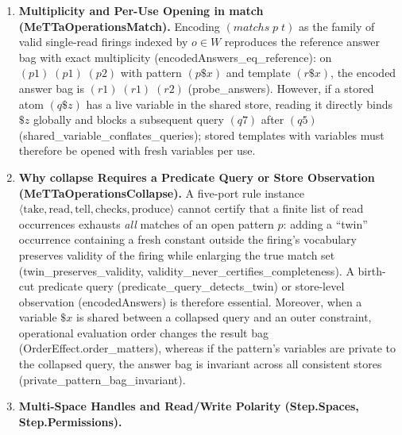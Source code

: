\documentclass[11pt,a4paper]{article}
\theoremstyle{definition}
\DeclareRobustCommand{\lean}[1]{%
  \ifmmode\text{\normalfont\ttfamily\footnotesize\detokenize{#1}}%
  \else{\normalfont\footnotesize\leanurl{#1}}\fi}
\DeclareRobustCommand{\metta}[1]{\text{\normalfont\ttfamily\footnotesize #1}}
\def\lean#1{#1}%
\def\metta#1{#1}%
\begin{document}
\begin{enumerate}[leftmargin=2em, nosep]
  \item \textbf{Multiplicity and Per-Use Opening in \metta{match} (\lean{MeTTaOperationsMatch}).}
  Encoding $\metta{(match }\!s\;p\;t\metta{)}$ as the family of valid single-read firings indexed by $o \in W$ reproduces the reference answer bag with exact multiplicity (\lean{encodedAnswers_eq_reference}): on $\metta{(p 1)}\;\metta{(p 1)}\;\metta{(p 2)}$ with pattern $\metta{(p \$x)}$ and template $\metta{(r \$x)}$, the encoded answer bag is $\metta{(r 1)}\;\metta{(r 1)}\;\metta{(r 2)}$ (\lean{probe_answers}). However, if a stored atom $\metta{(q \$z)}$ has a live variable in the shared store, reading it directly binds $\$z$ globally and blocks a subsequent query $\metta{(q 7)}$ after $\metta{(q 5)}$ (\lean{shared_variable_conflates_queries}); stored templates with variables must therefore be opened with fresh variables per use.
  \item \textbf{Why \metta{collapse} Requires a Predicate Query or Store Observation (\lean{MeTTaOperationsCollapse}).}
  A five-port rule instance $\langle \mathrm{take}, \mathrm{read}, \mathrm{tell}, \mathrm{checks}, \mathrm{produce} \rangle$ cannot certify that a finite list of read occurrences exhausts \emph{all} matches of an open pattern $p$: adding a ``twin'' occurrence containing a fresh constant outside the firing's vocabulary preserves validity of the firing while enlarging the true match set (\lean{twin_preserves_validity}, \lean{validity_never_certifies_completeness}). A birth-cut predicate query (\lean{predicate_query_detects_twin}) or store-level observation (\lean{encodedAnswers}) is therefore essential. Moreover, when a variable $\$x$ is shared between a collapsed query and an outer constraint, operational evaluation order changes the result bag (\lean{OrderEffect.order_matters}), whereas if the pattern's variables are private to the collapsed query, the answer bag is invariant across all consistent stores (\lean{private_pattern_bag_invariant}).
  \item \textbf{Multi-Space Handles and Read/Write Polarity (\lean{Step.Spaces}, \lean{Step.Permissions}).}

\end{enumerate}
\end{document}
